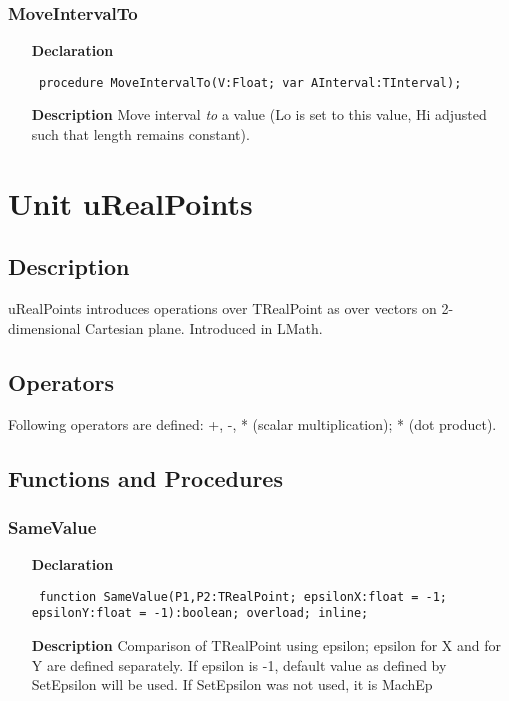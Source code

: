 \documentclass[12pt,a4paper,oneside]{report}
\newcommand{\lmath}[1]{   %
	\marginpar{\vspace{#1} 
		\begin{flushright}
			LMath
	\end{flushright} }
}
\newcommand{\declarationitem}[1]{\textbf{#1}}
\newcommand{\descriptiontitle}[1]{\textbf{#1}}
\newcommand{\code}[1]{\texttt{#1}}
\begin{document}
\subsubsection{MoveIntervalTo}
\label{uIntervals-MoveIntervalTo}
\begin{itemize}\item[\declarationitem{Declaration}\hfill]
	\begin{flushleft}
		\code{
			procedure MoveIntervalTo(V:Float; var AInterval:TInterval);}
	\end{flushleft}
	\item[\descriptiontitle{Description}]
	Move interval \textit{to} a value (Lo is set to this value, Hi adjusted such that length remains constant).
\end{itemize}

\section{Unit uRealPoints}\lmath{-24pt}
\label{uRealPoints}
\subsection{Description}
uRealPoints introduces operations over TRealPoint as over vectors on 2-dimensional Cartesian plane. Introduced in LMath.
\subsection{Operators} 
Following operators are defined:
+, -, * (scalar multiplication); * (dot product). 
\subsection{Functions and Procedures}
\subsubsection{SameValue}
\label{uRealPoints-SameValue}
\begin{itemize}\item[\declarationitem{Declaration}\hfill]
\begin{flushleft}
\code{
function SameValue(P1,P2:TRealPoint; epsilonX:float = -1; epsilonY:float = -1):boolean; overload; inline;}

\end{flushleft}

\par
\item[\descriptiontitle{Description}]
Comparison of TRealPoint using epsilon; epsilon for X and for Y are defined separately. If epsilon is {-}1, default value as defined by SetEpsilon will be used. If SetEpsilon was not used, it is MachEp

\end{itemize}
\end{document}
